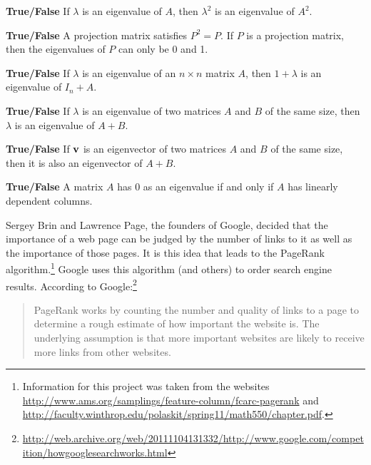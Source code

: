 \item \textbf{True/False} If $\lambda$ is an eigenvalue of $A$, then $\lambda^2$ is an eigenvalue of $A^2$.

\item \textbf{True/False} A projection matrix satisfies $P^2=P$. If $P$ is a projection matrix, then the eigenvalues of $P$ can only be 0 and 1.

\item \textbf{True/False} If $\lambda$ is an eigenvalue of an $n\times n$ matrix $A$, then $1+\lambda$ is an eigenvalue of $I_n+A$.

\item \textbf{True/False} If $\lambda$ is an eigenvalue of two matrices $A$ and $B$ of the same size, then $\lambda$ is an eigenvalue of $A+B$.

\item \textbf{True/False} If $\mathbf{v}$ is an eigenvector of two matrices $A$ and $B$ of the same size, then it is also an eigenvector of $A+B$.

\item \textbf{True/False} A matrix $A$ has 0 as an eigenvalue if and only if $A$ has linearly dependent columns.

\ea
\ee


Sergey Brin and Lawrence Page, the founders of Google, decided that the importance of a web page can be judged by the number of links to it as well as the importance of those pages. It is this idea that leads to the PageRank algorithm.\footnote{Information for this project  was taken from the websites \url{http://www.ams.org/samplings/feature-column/fcarc-pagerank} and \url{http://faculty.winthrop.edu/polaskit/spring11/math550/chapter.pdf}.} Google uses this algorithm (and others) to order search engine results. According to Google:\footnote{\url{http://web.archive.org/web/20111104131332/http://www.google.com/competition/howgooglesearchworks.html}}
\begin{quote}
PageRank works by counting the number and quality of links to a page to determine a rough estimate of how important the website is. The underlying assumption is that more important websites are likely to receive more links from other websites.
\end{quote}

